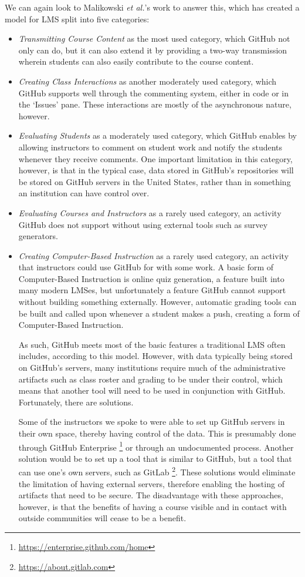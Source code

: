 We can again look to Malikowski \textit{et al.}'s \cite{malikowski2007model} work to answer this, which has created a model for LMS split into five categories: \\
\begin{itemize}
\item \emph{Transmitting Course Content} as the most used category, which GitHub not only can do, but it can also extend it by providing a two-way transmission wherein students can also easily contribute to the course content.
\item \emph{Creating Class Interactions} as another moderately used category, which GitHub supports well through the commenting system, either in code or in the `Issues' pane. These interactions are mostly of the asynchronous nature, however.
\item \emph{Evaluating Students} as a moderately used category, which GitHub enables by allowing instructors to comment on student work and notify the students whenever they receive comments. One important limitation in this category, however, is that in the typical case, data stored in GitHub's repositories will be stored on GitHub servers in the United States, rather than in something an institution can have control over.
\item \emph{Evaluating Courses and Instructors} as a rarely used category, an activity GitHub does not support without using external tools such as survey generators.
\item \emph{Creating Computer-Based Instruction} as a rarely used category, an activity that instructors could use GitHub for with some work. A basic form of Computer-Based Instruction is online quiz generation, a feature built into many modern LMSes, but unfortunately a feature GitHub cannot support without building something externally. However, automatic grading tools can be built and called upon whenever a student makes a push, creating a form of Computer-Based Instruction.

As such, GitHub meets most of the basic features a traditional LMS often includes, according to this model. However, with data typically being stored on GitHub's servers, many institutions require much of the administrative artifacts such as class roster and grading to be under their control, which means that another tool will need to be used in conjunction with GitHub. Fortunately, there are solutions.

Some of the instructors we spoke to were able to set up GitHub servers in their own space, thereby having control of the data. This is presumably done through GitHub Enterprise \footnote{\url{https://enterprise.github.com/home}} or through an undocumented process. Another solution would be to set up a tool that is similar to GitHub, but a tool that can use one's own servers, such as GitLab \footnote{\url{https://about.gitlab.com}}. These solutions would eliminate the limitation of having external servers, therefore enabling the hosting of artifacts that need to be secure. The disadvantage with these approaches, however, is that the benefits of having a course visible and in contact with outside communities will cease to be a benefit.


\end{itemize}
